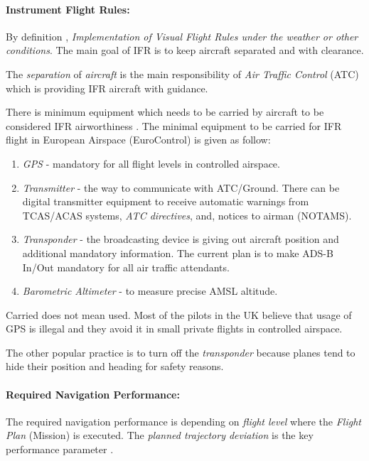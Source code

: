 \paragraph{Instrument Flight Rules:} By definition \cite{icaoAnnex2}, \emph{Implementation of Visual Flight Rules under the weather or other conditions}. The main goal of IFR is to keep aircraft separated and with clearance.

The \emph{separation} of \emph{aircraft} is the main responsibility of \emph{Air Traffic Control} (ATC) which is providing IFR aircraft with guidance.

There is minimum equipment which needs to be carried by aircraft to be considered IFR airworthiness \cite{icao4444}. The minimal equipment to be carried for IFR flight in European Airspace (EuroControl) is given as follow:
\begin{enumerate}
    \item \emph{GPS} - mandatory for all flight levels in controlled airspace. 
    
    \item \emph{Transmitter} - the way to communicate with ATC/Ground. There can be digital transmitter equipment to receive automatic warnings from TCAS/ACAS systems, \emph{ATC directives}, and, notices to airman (NOTAMS).
    
    \item \emph{Transponder} - the broadcasting device is giving out aircraft position and additional mandatory information. The current plan is to make ADS-B In/Out mandatory for all air traffic attendants.
    
    \item \emph{Barometric Altimeter} - to measure precise AMSL altitude.
\end{enumerate}


\begin{note}
    Carried does not mean used. Most of the pilots in the UK believe that usage of GPS is illegal and they avoid it in small private flights in controlled airspace.
    
    The other popular practice is to turn off the \emph{transponder} because planes tend to hide their position and heading for safety reasons.
\end{note}

\paragraph{Required Navigation Performance:} The required navigation performance is depending on \emph{flight level} where the \emph{Flight Plan} (Mission) is executed. The \emph{planned trajectory deviation} is the key performance parameter \cite{icao4444}.